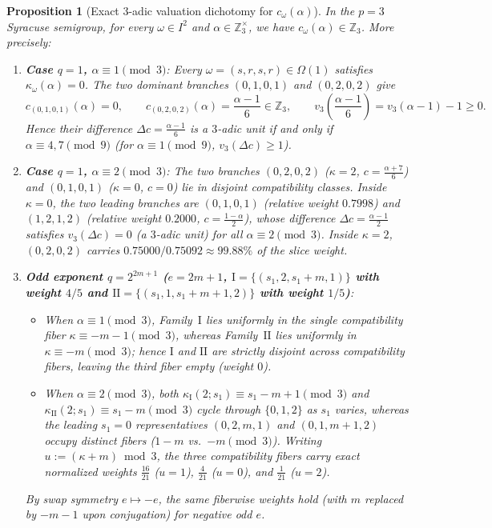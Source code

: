 \documentclass[11pt,a4paper]{article}
\numberwithin{equation}{section}
\newtheorem{proposition}[theorem]{Proposition}
\theoremstyle{definition}
\theoremstyle{remark}
\newcommand{\Z}{\mathbb{Z}}
\begin{document}
\begin{proposition}[Exact $3$-adic valuation dichotomy for $c_\omega(\alpha)$]\label{prop:3adic_val}
In the $p = 3$ Syracuse semigroup, for every $\omega \in I^2$ and $\alpha \in \Z_3^\times$, we have $c_\omega(\alpha) \in \Z_3$. More precisely:
\begin{enumerate}[label=(\arabic*)]
\item \textbf{Case $q = 1$, $\alpha \equiv 1 \pmod 3$}: Every $\omega = (s, r, s, r) \in \Omega(1)$ satisfies $\kappa_\omega(\alpha) = 0$. The two dominant branches $(0, 1, 0, 1)$ and $(0, 2, 0, 2)$ give
\[
c_{(0, 1, 0, 1)}(\alpha) = 0, \qquad c_{(0, 2, 0, 2)}(\alpha) = \frac{\alpha - 1}{6} \in \Z_3, \qquad v_3\!\left(\frac{\alpha - 1}{6}\right) = v_3(\alpha - 1) - 1 \ge 0.
\]
Hence their difference $\Delta c = \frac{\alpha-1}{6}$ is a $3$-adic unit if and only if $\alpha \equiv 4, 7 \pmod 9$ (for $\alpha \equiv 1 \pmod 9$, $v_3(\Delta c) \ge 1$).
\item \textbf{Case $q = 1$, $\alpha \equiv 2 \pmod 3$}: The two branches $(0, 2, 0, 2)$ ($\kappa = 2$, $c = \frac{\alpha+7}{6}$) and $(0, 1, 0, 1)$ ($\kappa = 0$, $c = 0$) lie in \emph{disjoint} compatibility classes. Inside $\kappa = 0$, the two leading branches are $(0, 1, 0, 1)$ (relative weight $0.7998$) and $(1, 2, 1, 2)$ (relative weight $0.2000$, $c = \frac{1-\alpha}{2}$), whose difference $\Delta c = \frac{\alpha - 1}{2}$ satisfies $v_3(\Delta c) = 0$ (a $3$-adic unit) for \emph{all} $\alpha \equiv 2 \pmod 3$. Inside $\kappa = 2$, $(0, 2, 0, 2)$ carries $0.75000/0.75092 \approx 99.88\%$ of the slice weight.
\item \textbf{Odd exponent $q = 2^{2m+1}$ ($e = 2m+1$, $\mathrm{I} = \{(s_1, 2, s_1+m, 1)\}$ with weight $4/5$ and $\mathrm{II} = \{(s_1, 1, s_1+m+1, 2)\}$ with weight $1/5$)}:
\begin{itemize}[leftmargin=1.5em]
\item When $\alpha \equiv 1 \pmod 3$, Family~$\mathrm{I}$ lies uniformly in the single compatibility fiber $\kappa \equiv -m - 1 \pmod 3$, whereas Family~$\mathrm{II}$ lies uniformly in $\kappa \equiv -m \pmod 3$; hence $\mathrm{I}$ and $\mathrm{II}$ are strictly disjoint across compatibility fibers, leaving the third fiber empty (weight $0$).
\item When $\alpha \equiv 2 \pmod 3$, both $\kappa_{\mathrm{I}}(2; s_1) \equiv s_1 - m + 1 \pmod 3$ and $\kappa_{\mathrm{II}}(2; s_1) \equiv s_1 - m \pmod 3$ cycle through $\{0, 1, 2\}$ as $s_1$ varies, whereas the leading $s_1 = 0$ representatives $(0, 2, m, 1)$ and $(0, 1, m+1, 2)$ occupy distinct fibers ($1 - m$ vs.\ $-m \pmod 3$). Writing $u := (\kappa + m) \bmod 3$, the three compatibility fibers carry exact normalized weights $\frac{16}{21}$ ($u = 1$), $\frac{4}{21}$ ($u = 0$), and $\frac{1}{21}$ ($u = 2$).
\end{itemize}
By swap symmetry $e \mapsto -e$, the same fiberwise weights hold (with $m$ replaced by $-m-1$ upon conjugation) for negative odd $e$.
\end{enumerate}
\end{proposition}
\end{document}

